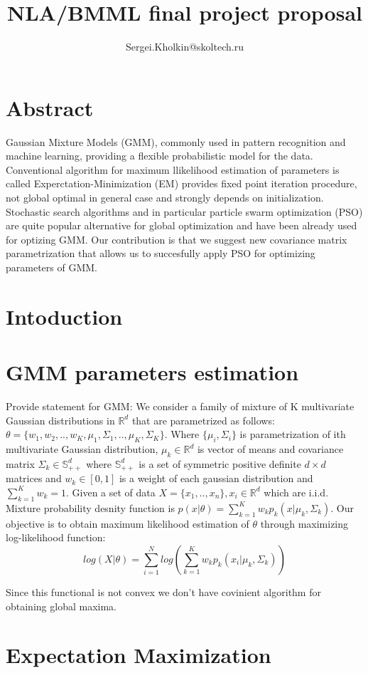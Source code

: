 \documentclass[a4paper]{article}
\title{NLA/BMML final project proposal}
\author{Sergei.Kholkin@skoltech.ru}
\begin{document}
\section{Abstract}

Gaussian Mixture Models (GMM), commonly used in pattern recognition and machine learning, providing
a flexible probabilistic model for the data. Conventional algorithm for maximum llikelihood estimation of parameters 
is called Experctation-Minimization (EM) provides fixed point iteration procedure, 
not global optimal in general case and strongly depends on initialization. Stochastic search algorithms
 and in particular particle swarm optimization (PSO) are quite
popular alternative for global optimization and have been already used for optizing GMM. 
Our contribution is that we suggest new covariance matrix parametrization that allows us to succesfully apply PSO for optimizing parameters of GMM.

\section{Intoduction}

\section{GMM parameters estimation}

Provide statement for GMM:
We consider a family of mixture of K multivariate Gaussian distributions in $\mathbb{R}^d$ that are
 parametrized as follows: $\theta = \{w_1, w_2, .., w_K, \mu_1, \Sigma_1, .., \mu_K, \Sigma_K\}$. 
 Where $\{\mu_i, \Sigma_i\}$ is parametrization of ith multivariate Gaussian distribution, 
 $\mu_k \in \mathbb{R}^d$ is vector of means and covariance matrix $\Sigma_k \in \mathbb{S}^d_{++}$ where 
 $\mathbb{S}^d_{++}$ is a set of symmetric positive definite $d \times d$ matrices and $w_k \in [0, 1]$ 
 is a weight of each gaussian distribution and $\sum_{k=1}^K w_k=1$.
 Given a set of data $X = \{x_1, .., x_n\}, x_i \in \mathbb{R}^d$ which are i.i.d. Mixture probability desnity function is 
 $p(x | \theta) = \sum_{k=1}^K w_k p_k(x | \mu_k, \Sigma_k)$. Our objective is to obtain maximum likelihood estimation of $\theta$
 through maximizing log-likelihood function:
 $$log(X | \theta) = \sum_{i=1}^N log (\sum_{k=1}^K w_k p_k(x_i | \mu_k, \Sigma_k))$$

 Since this functional is not convex we don't have covinient algorithm for obtaining global maxima.

\section{Expectation Maximization}
\end{document}
